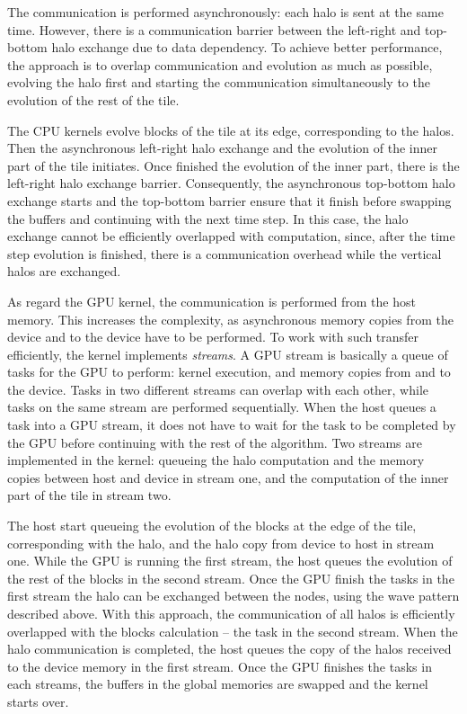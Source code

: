 The communication is performed asynchronously: each halo is sent at the same time. However, there is a communication barrier between the left-right and top-bottom halo exchange due to data dependency. To achieve better performance, the approach is to overlap communication and evolution as much as possible, evolving the halo first and starting the communication simultaneously to the evolution of the rest of the tile. 

The CPU kernels evolve blocks of the tile at its edge, corresponding to the halos. Then the asynchronous left-right halo exchange and the evolution of the inner part of the tile initiates. Once finished the evolution of the inner part, there is the left-right halo exchange barrier. Consequently, the asynchronous top-bottom halo exchange starts and the top-bottom barrier ensure that it finish before swapping the buffers and continuing with the next time step. In this case, the halo exchange cannot be efficiently overlapped with computation, since, after the time step evolution is finished, there is a communication overhead while the vertical halos are exchanged.

As regard the GPU kernel, the communication is performed from the host memory. This increases the complexity, as asynchronous memory copies from the device and to the device have to be performed. To work with such transfer efficiently, the kernel implements \textit{streams}. A GPU stream is basically a queue of tasks for the GPU to perform: kernel execution, and memory copies from and to the device. Tasks in two different streams can overlap with each other, while tasks on the same stream are performed sequentially. When the host queues a task into a GPU stream, it does not have to wait for the task to be completed by the GPU before continuing with the rest of the algorithm. Two streams are implemented in the kernel: queueing the halo computation and the memory copies between host and device in stream one, and the computation of the inner part of the tile in stream two.

The host start queueing the evolution of the blocks at the edge of the tile, corresponding with the halo, and the halo copy from device to host in stream one. While the GPU is running the first stream, the host queues the evolution of the rest of the blocks in the second stream. Once the GPU finish the tasks in the first stream the halo can be exchanged between the nodes, using the wave pattern described above. With this approach, the communication of all halos is efficiently overlapped with the blocks calculation -- the task in the second stream. When the halo communication is completed, the host queues the copy of the halos received to the device memory in the first stream. Once the GPU finishes the tasks in each streams, the buffers in the global memories are swapped and the kernel starts over.

